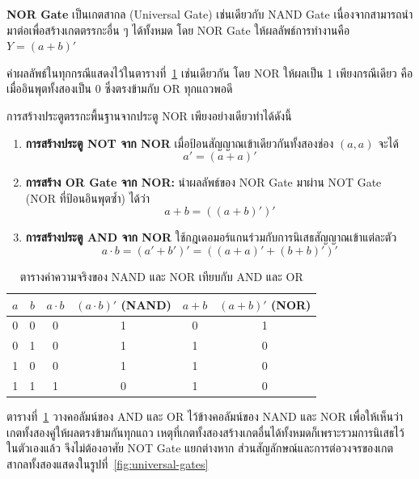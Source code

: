 \begin{principle}
\textbf{NOR Gate} เป็นเกตสากล (Universal Gate) เช่นเดียวกับ NAND Gate เนื่องจากสามารถนำมาต่อเพื่อสร้างเกตตรรกะอื่น ๆ ได้ทั้งหมด โดย NOR Gate ให้ผลลัพธ์การทำงานคือ $Y = (a + b)'$

ค่าผลลัพธ์ในทุกกรณีแสดงไว้ในตารางที่~\ref{tab:nand-nor-truth} เช่นเดียวกัน โดย NOR ให้ผลเป็น 1 เพียงกรณีเดียว คือเมื่ออินพุตทั้งสองเป็น 0 ซึ่งตรงข้ามกับ OR ทุกแถวพอดี

การสร้างประตูตรรกะพื้นฐานจากประตู NOR เพียงอย่างเดียวทำได้ดังนี้
\begin{enumerate}[label=\textbf{\arabic*.},leftmargin=1.5em,itemsep=0.4em]
    \item \textbf{การสร้างประตู NOT จาก NOR} เมื่อป้อนสัญญาณเข้าเดียวกันทั้งสองช่อง $(a, a)$ จะได้
    \[ a' = (a + a)' \]
    \item \textbf{การสร้าง OR Gate จาก NOR:} นำผลลัพธ์ของ NOR Gate มาผ่าน NOT Gate (NOR ที่ป้อนอินพุตซ้ำ) ได้ว่า
    \[ a + b = ((a + b)')' \]
    \item \textbf{การสร้างประตู AND จาก NOR} ใช้กฎเดอมอร์แกนร่วมกับการนิเสธสัญญาณเข้าแต่ละตัว
    \[ a \cdot b = (a' + b')' = ((a + a)' + (b + b)')' \]
\end{enumerate}
\end{principle}

\begin{table}[H]
    \centering
    \caption{ตารางค่าความจริงของ NAND และ NOR เทียบกับ AND และ OR}
    \label{tab:nand-nor-truth}
    \begin{tabular}{|c|c|c|c|c|c|}
        \hline
        $a$ & $b$ & $a \cdot b$ & $(a \cdot b)'$ (NAND) & $a + b$ & $(a + b)'$ (NOR) \\ \hline
        0 & 0 & 0 & 1 & 0 & 1 \\ \hline
        0 & 1 & 0 & 1 & 1 & 0 \\ \hline
        1 & 0 & 0 & 1 & 1 & 0 \\ \hline
        1 & 1 & 1 & 0 & 1 & 0 \\ \hline
    \end{tabular}
\end{table}

ตารางที่~\ref{tab:nand-nor-truth} วางคอลัมน์ของ AND และ OR ไว้ข้างคอลัมน์ของ NAND และ NOR เพื่อให้เห็นว่าเกตทั้งสองคู่ให้ผลตรงข้ามกันทุกแถว เหตุที่เกตทั้งสองสร้างเกตอื่นได้ทั้งหมดก็เพราะรวมการนิเสธไว้ในตัวเองแล้ว จึงไม่ต้องอาศัย NOT Gate แยกต่างหาก ส่วนสัญลักษณ์และการต่อวงจรของเกตสากลทั้งสองแสดงในรูปที่~\ref{fig:universal-gates}


